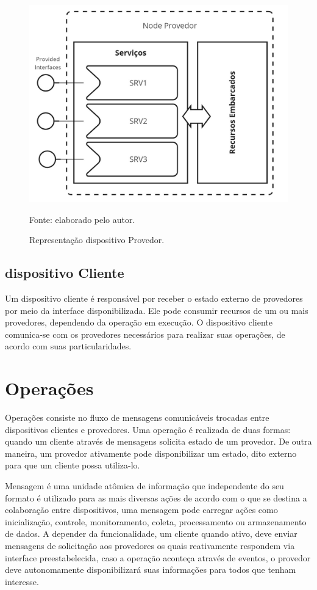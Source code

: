 \begin{figure}[H]
	\centering
	\caption{Representação dispositivo Provedor.}
	\label{fig:cap4bolotaprovedor}
	\includegraphics[width=0.7\linewidth]{Imagens/cap4/cap4nodeprovedor}	
	
	Fonte: elaborado pelo autor.
\end{figure}

\subsection{dispositivo Cliente}
Um dispositivo cliente é responsável por receber o estado externo de provedores por meio da interface disponibilizada. Ele pode consumir recursos de um ou mais provedores, dependendo da operação em execução. O dispositivo cliente comunica-se com os provedores necessários para realizar suas operações, de acordo com suas particularidades. 

\section{Operações}
Operações consiste no fluxo de mensagens comunicáveis trocadas entre dispositivos clientes e provedores. Uma operação é realizada de duas formas: quando um cliente através de mensagens solicita estado de um provedor. De outra maneira, um provedor ativamente pode disponibilizar um estado, dito externo para que um cliente possa utiliza-lo. 

Mensagem é uma unidade atômica de informação que independente do seu formato é utilizado para as mais diversas ações de acordo com o que se destina a colaboração entre dispositivos, uma mensagem pode carregar ações como  inicialização, controle, monitoramento, coleta, processamento ou armazenamento de dados. A depender da funcionalidade, um cliente quando ativo, deve enviar mensagens de solicitação aos provedores os quais reativamente respondem via interface preestabelecida, caso a operação aconteça através de eventos, o provedor deve autonomamente disponibilizará suas informações para todos que tenham interesse.

